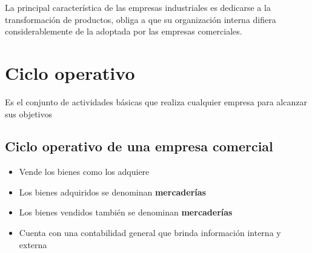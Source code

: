 \documentclass{report}
\begin{document}
La principal característica de las empresas industriales es dedicarse a la
transformación de productos, obliga a que su organización interna difiera
considerablemente de la adoptada por las empresas comerciales.

\section{Ciclo operativo}

Es el conjunto de actividades básicas que realiza cualquier empresa para
alcanzar sus objetivos

\subsection{Ciclo operativo de una empresa comercial}

\begin{center}
\end{center}

\begin{itemize}
    \item Vende los bienes como los adquiere
    \item Los bienes adquiridos se denominan \textbf{mercaderías}
    \item Los bienes vendidos también se denominan \textbf{mercaderías}
    \item Cuenta con una contabilidad general que brinda información interna y externa
\end{itemize}
\end{document}
